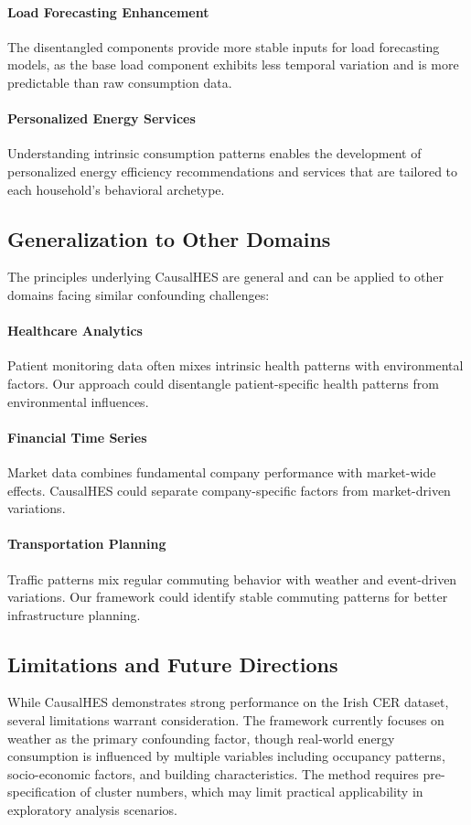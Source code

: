 \documentclass[journal]{IEEEtran}
\begin{document}
\paragraph{Load Forecasting Enhancement}
The disentangled components provide more stable inputs for load forecasting models, as the base load component exhibits less temporal variation and is more predictable than raw consumption data.

\paragraph{Personalized Energy Services}
Understanding intrinsic consumption patterns enables the development of personalized energy efficiency recommendations and services that are tailored to each household's behavioral archetype.

\subsection{Generalization to Other Domains}
The principles underlying CausalHES are general and can be applied to other domains facing similar confounding challenges:

\paragraph{Healthcare Analytics}
Patient monitoring data often mixes intrinsic health patterns with environmental factors. Our approach could disentangle patient-specific health patterns from environmental influences.

\paragraph{Financial Time Series}
Market data combines fundamental company performance with market-wide effects. CausalHES could separate company-specific factors from market-driven variations.

\paragraph{Transportation Planning}
Traffic patterns mix regular commuting behavior with weather and event-driven variations. Our framework could identify stable commuting patterns for better infrastructure planning.

\subsection{Limitations and Future Directions}
While CausalHES demonstrates strong performance on the Irish CER dataset, several limitations warrant consideration. The framework currently focuses on weather as the primary confounding factor, though real-world energy consumption is influenced by multiple variables including occupancy patterns, socio-economic factors, and building characteristics. The method requires pre-specification of cluster numbers, which may limit practical applicability in exploratory analysis scenarios.
\end{document}
